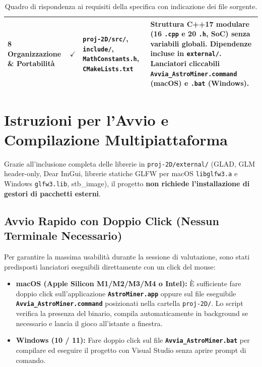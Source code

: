 \documentclass[11pt,a4paper]{article}
\begin{document}
\begin{table}[H]
\begin{tabularx}{\linewidth}{@{}p{3.2cm} c p{4.2cm} X@{}}
\addlinespace[0.2cm]
\textbf{8 Organizzazione \& Portabilità} & {\color{checkGreen}\textbf{$\checkmark$}} & \texttt{proj-2D/src/}, \texttt{include/}, \texttt{MathConstants.h}, \texttt{CMakeLists.txt} & Struttura C++17 modulare (16 \texttt{.cpp} e 20 \texttt{.h}, SoC) senza variabili globali. Dipendenze incluse in \texttt{external/}. Lanciatori cliccabili \texttt{Avvia\_AstroMiner.command} (macOS) e \texttt{.bat} (Windows). \\
\bottomrule
\end{tabularx}
\caption{Quadro di rispondenza ai requisiti della specifica con indicazione dei file sorgente.}
\label{tab:evaluation}
\end{table}

\section{Istruzioni per l'Avvio e Compilazione Multipiattaforma}

Grazie all'inclusione completa delle librerie in \texttt{proj-2D/external/} (GLAD, GLM header-only, Dear ImGui, librerie statiche GLFW per macOS \texttt{libglfw3.a} e Windows \texttt{glfw3.lib}, stb\_image), il progetto \textbf{non richiede l'installazione di gestori di pacchetti esterni}.

\subsection{Avvio Rapido con Doppio Click (Nessun Terminale Necessario)}
Per garantire la massima usabilità durante la sessione di valutazione, sono stati predisposti lanciatori eseguibili direttamente con un click del mouse:
\begin{itemize}
    \item \textbf{macOS (Apple Silicon M1/M2/M3/M4 o Intel):}
    È sufficiente fare doppio click sull'applicazione \textbf{\texttt{AstroMiner.app}} oppure sul file eseguibile \textbf{\texttt{Avvia\_AstroMiner.command}} posizionati nella cartella \texttt{proj-2D/}. Lo script verifica la presenza del binario, compila automaticamente in background se necessario e lancia il gioco all'istante a finestra.
    \item \textbf{Windows (10 / 11):}
    Fare doppio click sul file \textbf{\texttt{Avvia\_AstroMiner.bat}} per compilare ed eseguire il progetto con Visual Studio senza aprire prompt di comando.
\end{itemize}
\end{document}
